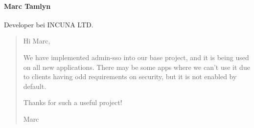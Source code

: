 \paragraph{Marc Tamlyn}
Developer bei INCUNA LTD.
\begin{quote}
  Hi Marc,

  We have implemented admin-sso into our base project, and it is being used on all new applications. There may be some apps where we can't use it due to clients having odd requirements on security, but it is not enabled by default.

  Thanks for such a useful project!

  Marc
\end{quote}

